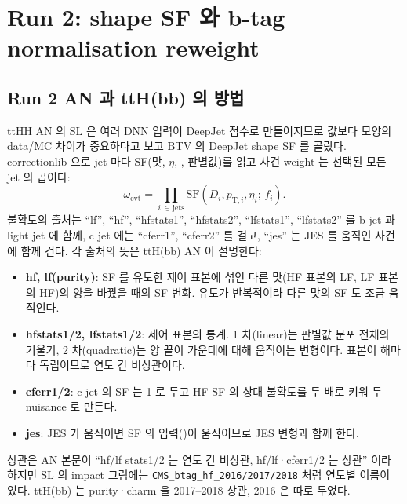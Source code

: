 \section{Run 2: shape SF 와 b-tag normalisation reweight}\label{sec:btag-run2}

\subsection{Run 2 AN 과 ttH(bb) 의 방법}\label{sec:btag-run2-an}

ttHH AN 의 SL 은 여러 DNN 입력이 DeepJet 점수로 만들어지므로 값보다 모양의 data/MC 차이가 중요하다고 보고 BTV 의 DeepJet shape SF 를
골랐다. correctionlib 으로 jet 마다 SF(맛, $\eta$, \pt, 판별값)를 읽고 사건 weight 는 선택된 모든 jet 의 곱이다:
\begin{equation}
  \omega_\text{evt} = \prod_{i\,\in\,\text{jets}} \mathrm{SF}(D_i, p_{\mathrm{T},i}, \eta_i;\, f_i).
  \label{eq:btag-shape-weight}
\end{equation}
불확도의 출처는 ``lf'', ``hf'', ``hfstats1'', ``hfstats2'', ``lfstats1'', ``lfstats2'' 를 b jet 과 light jet 에 함께, c jet 에는
``cferr1'', ``cferr2'' 를 걸고, ``jes'' 는 JES 를 움직인 사건에 함께 건다. 각 출처의 뜻은 ttH(bb) AN 이
설명한다:
\begin{itemize}
\item \textbf{hf, lf(purity)}: SF 를 유도한 제어 표본에 섞인 다른 맛(HF 표본의 LF, LF 표본의 HF)의 양을 바꿨을 때의 SF 변화. 유도가 반복적이라
  다른 맛의 SF 도 조금 움직인다.
\item \textbf{hfstats1/2, lfstats1/2}: 제어 표본의 통계. 1 차(linear)는 판별값 분포 전체의 기울기, 2 차(quadratic)는 양 끝이 가운데에 대해
  움직이는 변형이다. 표본이 해마다 독립이므로 연도 간 비상관이다.
\item \textbf{cferr1/2}: c jet 의 SF 는 1 로 두고 HF SF 의 상대 불확도를 두 배로 키워 두 nuisance 로 만든다.
\item \textbf{jes}: JES 가 움직이면 SF 의 입력(\pt)이 움직이므로 JES 변형과 함께 한다.
\end{itemize}
상관은 AN 본문이 ``hf/lf stats1/2 는 연도 간 비상관, hf/lf·cferr1/2 는 상관'' 이라 하지만 SL 의 impact
그림에는 \texttt{CMS\_btag\_hf\_2016/2017/2018} 처럼 연도별 이름이 있다. ttH(bb) 는 purity·charm 을
2017–2018 상관, 2016 은 따로 두었다.

